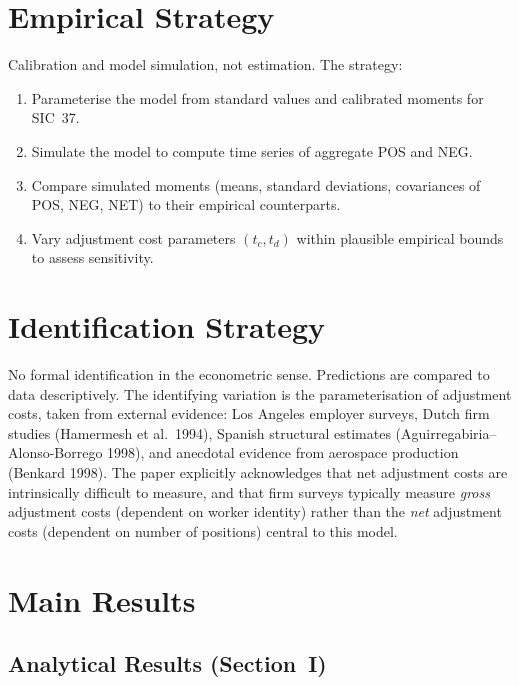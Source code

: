\section{Empirical Strategy}

Calibration and model simulation, not estimation. The strategy:
\begin{enumerate}
  \item Parameterise the model from standard values and calibrated moments
    for SIC~37.
  \item Simulate the model to compute time series of aggregate POS and NEG.
  \item Compare simulated moments (means, standard deviations, covariances of
    POS, NEG, NET) to their empirical counterparts.
  \item Vary adjustment cost parameters $(t_c, t_d)$ within plausible empirical
    bounds to assess sensitivity.
\end{enumerate}

\section{Identification Strategy}

No formal identification in the econometric sense. Predictions are compared to
data descriptively. The identifying variation is the parameterisation of
adjustment costs, taken from external evidence: Los Angeles employer surveys,
Dutch firm studies (Hamermesh et al.\ 1994), Spanish structural estimates
(Aguirregabiria--Alonso-Borrego 1998), and anecdotal evidence from aerospace
production (Benkard 1998). The paper explicitly acknowledges that net
adjustment costs are intrinsically difficult to measure, and that firm surveys
typically measure \emph{gross} adjustment costs (dependent on worker identity)
rather than the \emph{net} adjustment costs (dependent on number of positions)
central to this model.

\section{Main Results}

\subsection*{Analytical Results (Section~I)}

